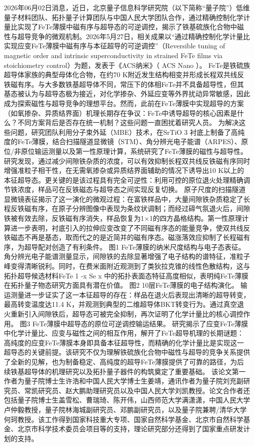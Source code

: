\documentclass[12pt,a4paper]{ctexart}
\begin{document}
2026年06月02日消息，近日，北京量子信息科学研究院（以下简称“量子院”）低维量子材料团队、拓扑量子计算团队与中国人民大学团队合作，通过精确控制化学计量比实现了FeTe薄膜中磁有序与超导态的可逆调控，揭示了铁基硫族化合物中磁性与超导竞争的微观机制。2026年5月27日，相关成果以“通过精确控制化学计量比实现应变FeTe薄膜中磁有序与本征超导的可逆调控”（Reversible tuning of magnetic order and intrinsic superconductivity in strained FeTe films via stoichiometry control）为题，发表于《ACS纳米》（
ACS Nano
）。
FeTe是铁硫族超导体家族的典型母体化合物，在约70 K附近发生结构相变并形成长程双共线反铁磁有序。与大多数铁基超导体不同，常压下的体相FeTe并不具备超导性，但其基态被认为与超导态极为接近，对化学掺杂、外延应变等外界扰动异常敏感，因此成为探索磁性与超导竞争的理想平台。然而，此前在FeTe薄膜中实现超导的方案（如氧掺杂、异质结界面）机理长期存在争议：FeTe中诱导超导的核心因素是什么？不同方案背后是否存在统一机制？这些问题一直困扰着研究人员。
为解决这些问题，研究团队利用分子束外延（MBE）技术，在SrTiO
3
衬底上制备了高纯度的FeTe薄膜，结合扫描隧道显微镜（STM）、角分辨光电子能谱（ARPES）、原位/非原位输运测量以及第一性原理计算，系统研究了FeTe薄膜的磁性与超导性。
研究发现，通过减少间隙铁杂质的浓度，可以有效抑制长程双共线反铁磁有序同时增强准粒子相干性，在无需氧掺杂或异质结界面辅助的情况下诱导出10 K以上的本征超导态。更关键的是该过程具有完全可逆性：利用可控的原位退火处理精确调节铁浓度，样品可在反铁磁态与超导态之间实现反复切换。
原子尺度的扫描隧道显微镜表征揭示了这一演化的微观过程：在富铁样品中，大量间隙铁杂质稳定了长程反铁磁有序，在原子分辨图像中表现为条纹状调制；而经过碲气氛退火后，间隙铁被有效去除，反铁磁有序消失，样品恢复为1×1的四方晶格结构。第一性原理计算进一步表明，衬底引入的拉伸应变改变了不同磁有序态的能量竞争，使双共线反铁磁态不再是基态，取而代之的是近简并的磁有序态。磁涨落效应抑制了长程磁有序，为超导配对创造了有利条件。
图1 FeTe薄膜的纳米尺度结构与电子态表征。
角分辨光电子能谱测量显示，间隙铁的去除显著增强了电子结构的谱特征，准粒子峰变得清晰锐利。同时，在费米面附近观测到了类狄拉克锥的线性色散结构，这与拓扑超导候选材料FeTe
1
-x
Se
x
中的拓扑表面态特征高度相似，表明纯FeTe薄膜在拓扑量子物态研究方面具有潜在价值。
图2 10层FeTe薄膜的电子结构演化。
输运测量进一步证实了这一本征超导的存在：样品在退火后表现出清晰的超导转变，最高转变温度达11.4 K，并观测到典型的二维超导体BKT转变行为。通过真空退火重新引入间隙铁后，超导态可被完全抑制，再次证明了化学计量比的核心调控作用。
图3 FeTe薄膜中超导态的原位可逆调控输运结果。
研究揭示了应变FeTe薄膜中化学计量比、应变与磁性之间的相互作用，解开了FeTe超导机理的长期谜题：高纯度的应变FeTe薄膜本身即具备本征超导性，而精确的化学计量比是实现这一超导态的关键前提。该研究不仅为理解铁硫族化合物中磁性与超导的竞争关系提供了全新的见解，也为制备稳定、高纯度的超导FeTe薄膜提供了可靠的路径，为后续铁基超导体的机理研究以及拓扑量子器件的构筑奠定了重要基础。
该论文第一作者为量子院博士生许浩和中国人民大学博士生姜靖，通讯作者为量子院刘充副研究员、常凯研究员、赵大鹏助理研究员以及中国人民大学刘凯教授。论文合作者还包括量子院博士生盖雪松、曹瑞琦、陈开伟，山西师范大学满潇潇，中国人民大学卢仲毅教授，量子院林海城副研究员、邓鹏副研究员，以及量子院兼聘/清华大学何珂教授。该工作得到国家科技重大专项、国家自然科学基金、北京市自然科学基金、北京市科学技术委员会项目等的支持，理论研究部分还得到了国家重点研发计划的支持。
\end{document}
